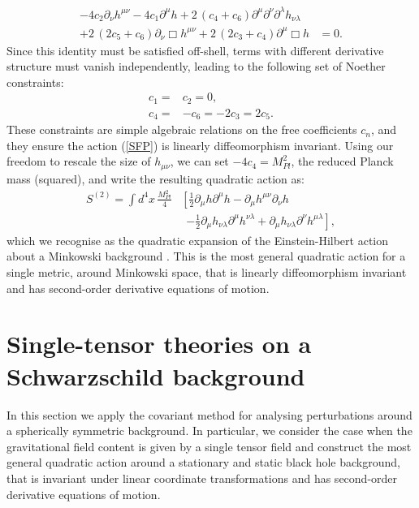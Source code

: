\documentclass[10pt,twocolumn,preprintnumbers,amsmath,amssymb,nofootinbib
,superscriptaddress]{revtex4-1}
\begin{document}
\begin{eqnarray}
-4c_2\partial_\nu h^{\mu\nu}-4c_1\partial^\mu h+2\, (c_4+c_6)\partial^\mu\partial^\nu\partial^\lambda h_{\nu\lambda} &\nonumber \\ +2\, (2c_5+c_6)\partial_\nu\Box h^{\mu\nu} +2\, (2c_3+c_4)\partial^\mu\Box h &=0.
\end{eqnarray}
Since this identity must be satisfied off-shell, terms with different derivative structure must vanish independently, leading to the following set of Noether constraints:
\begin{align}
 c_1= & c_2=0,\nonumber\\
 c_4= & -c_6=-2c_3=2c_5.
\end{align}
These constraints are simple algebraic relations on the free coefficients $c_n$, and they ensure the action (\ref{SFP}) is linearly diffeomorphism invariant. Using our freedom to rescale the size of $h_{\mu\nu}$, we can set $-4c_4=M_{Pl}^2$, the reduced Planck mass (squared), and write the resulting quadratic action as:
\begin{align}
 S^{(2)}= \int d^4x\,\frac{M_{Pl}^2}{4}&\left[ \frac{1}{2}\partial_\mu h \partial^\mu h - \partial_\mu h^{\mu\nu}\partial_\nu h \right. \nonumber \\ & \ \ \left.-\frac{1}{2}\partial_\mu h_{\nu\lambda}\partial^\mu h^{\nu\lambda}+\partial_\mu h_{\nu\lambda}\partial^\nu h^{\mu\lambda}\right], \label{SFPfinal}
\end{align}
which we recognise as the quadratic expansion of the Einstein-Hilbert action about a Minkowski background \cite{2011PhRvD..83f4038S}. This is the most general quadratic action for a single metric, around Minkowski space, that is linearly diffeomorphism invariant and has second-order derivative equations of motion.


\section{Single-tensor theories on a Schwarzschild background}\label{secGR}
In this section we apply the covariant method for analysing perturbations around a spherically symmetric background. In particular, we consider the case when the gravitational field content is given by a single tensor field and construct the most general quadratic action around a stationary and static black hole background, that is invariant under linear coordinate transformations and has second-order derivative equations of motion. 
\end{document}
